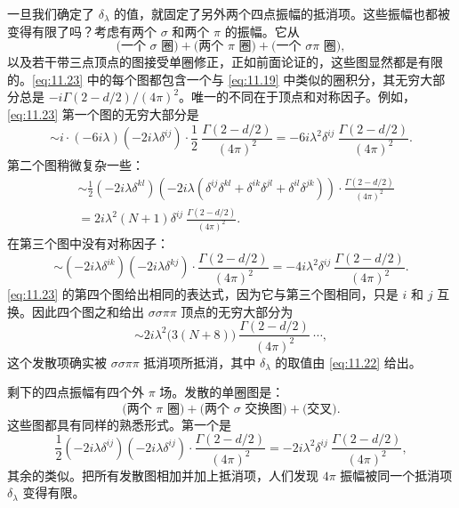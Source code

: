 一旦我们确定了 $\delta_\lambda$ 的值，就固定了另外两个四点振幅的抵消项。这些振幅也都被变得有限了吗？考虑有两个 $\sigma$ 和两个 $\pi$ 的振幅。它从
\begin{equation}
  \text{(一个 $\sigma$ 圈)} + \text{(两个 $\pi$ 圈)} + \text{(一个
    $\sigma\pi$ 圈)} ,
  \label{eq:11.23}
\end{equation}
以及若干带三点顶点的图接受单圈修正，正如前面论证的，这些图显然都是有限的。\eqref{eq:11.23} 中的每个图都包含一个与 \eqref{eq:11.19} 中类似的圈积分，其无穷大部分总是 $-i\Gamma(2-d/2)/(4\pi)^2$。唯一的不同在于顶点和对称因子。例如，\eqref{eq:11.23} 第一个图的无穷大部分是
\begin{equation}
  \sim i\cdot(-6i\lambda)(-2i\lambda\delta^{ij})\cdot
    \frac{1}{2}\ \frac{\Gamma(2-d/2)}{(4\pi)^2}
  = -6i\lambda^2\delta^{ij}\ \frac{\Gamma(2-d/2)}{(4\pi)^2} .
\end{equation}
第二个图稍微复杂一些：
\begin{equation}
  \begin{aligned}
    &\sim \frac{1}{2}(-2i\lambda\delta^{kl})(-2i\lambda(\delta^{ij}\delta^{kl}
      + \delta^{ik}\delta^{jl} + \delta^{il}\delta^{jk}))\cdot
        \frac{\Gamma(2-d/2)}{(4\pi)^2}\\
    &= 2i\lambda^2(N+1)\delta^{ij}\ \frac{\Gamma(2-d/2)}{(4\pi)^2} .
  \end{aligned}
\end{equation}
在第三个图中没有对称因子：
\begin{equation}
  \sim (-2i\lambda\delta^{ik})(-2i\lambda\delta^{kj})\cdot
    \frac{\Gamma(2-d/2)}{(4\pi)^2}
  = -4i\lambda^2\delta^{ij}\ \frac{\Gamma(2-d/2)}{(4\pi)^2} .
\end{equation}
\eqref{eq:11.23} 的第四个图给出相同的表达式，因为它与第三个图相同，只是 $i$ 和 $j$ 互换。因此四个图之和给出 $\sigma\sigma\pi\pi$ 顶点的无穷大部分为
\begin{equation}
  \sim 2i\lambda^2\bigl( 3(N+8) \bigr)\ \frac{\Gamma(2-d/2)}{(4\pi)^2}
  \ \cdots ,
  \label{eq:11.24}
\end{equation}
这个发散项确实被 $\sigma\sigma\pi\pi$ 抵消项所抵消，其中 $\delta_\lambda$ 的取值由 \eqref{eq:11.22} 给出。

剩下的四点振幅有四个外 $\pi$ 场。发散的单圈图是：
\begin{equation}
  \text{(两个 $\pi$ 圈)} + \text{(两个 $\sigma$ 交换图)}
    + \text{(交叉)} .
\end{equation}
这些图都具有同样的熟悉形式。第一个是
\begin{equation}
  \frac{1}{2}(-2i\lambda\delta^{ij})(-2i\lambda\delta^{ij})\cdot
    \frac{\Gamma(2-d/2)}{(4\pi)^2}
  = -2i\lambda^2\delta^{ij}\ \frac{\Gamma(2-d/2)}{(4\pi)^2} ,
  \label{eq:11.25}
\end{equation}
其余的类似。把所有发散图相加并加上抵消项，人们发现 $4\pi$ 振幅被同一个抵消项 $\delta_\lambda$ 变得有限。


